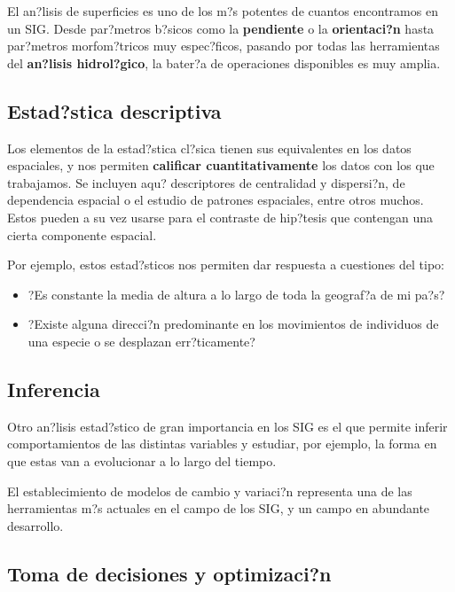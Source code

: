 El an?lisis de superficies es uno de los m?s potentes de cuantos encontramos en un SIG. Desde par?metros b?sicos como la \textbf{pendiente} o la \textbf{orientaci?n} hasta par?metros morfom?tricos muy espec?ficos, pasando por todas las herramientas del \textbf{an?lisis hidrol?gico}, la bater?a de operaciones disponibles es muy amplia. 

\subsection{Estad?stica descriptiva}

Los elementos de la estad?stica cl?sica tienen sus equivalentes en los datos espaciales, y nos permiten \textbf{calificar cuantitativamente} los datos con los que trabajamos. Se incluyen aqu? descriptores de centralidad y dispersi?n, de dependencia espacial o el estudio de patrones espaciales, entre otros muchos. Estos pueden a su vez usarse para el contraste de hip?tesis que contengan una cierta componente espacial.

Por ejemplo, estos estad?sticos nos permiten dar respuesta a cuestiones del tipo:

\begin{itemize}
\item ?Es constante la media de altura a lo largo de toda la geograf?a de mi pa?s?

\item ?Existe alguna direcci?n predominante en los movimientos de individuos de una especie o se desplazan err?ticamente?
\end{itemize}

\subsection{Inferencia}

Otro an?lisis estad?stico de gran importancia en los SIG es el que permite inferir comportamientos de las distintas variables y estudiar, por ejemplo, la forma en que estas van a evolucionar a lo largo del tiempo.

El establecimiento de modelos de cambio y variaci?n representa una de las herramientas m?s actuales en el campo de los SIG, y un campo en abundante desarrollo.

\subsection{Toma de decisiones y optimizaci?n}

